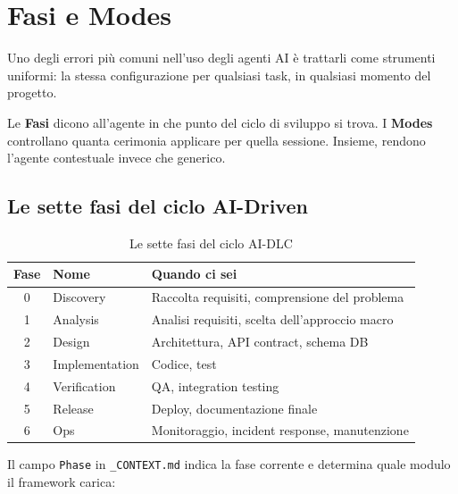 ﻿%

\chapter{Fasi e Modes}
\label{ch:fasi-e-modes}

Uno degli errori più comuni nell'uso degli agenti AI è trattarli come strumenti uniformi: la stessa configurazione per qualsiasi task, in qualsiasi momento del progetto.

Le \textbf{Fasi} dicono all'agente in che punto del ciclo di sviluppo si trova. I \textbf{Modes} controllano quanta cerimonia applicare per quella sessione. Insieme, rendono l'agente contestuale invece che generico.

\section{Le sette fasi del ciclo AI-Driven}
\label{sec:06-sette-fasi}

\begin{table}[htbp]
  \centering
  \begin{tabular}{cll}
    \toprule
    \textbf{Fase} & \textbf{Nome} & \textbf{Quando ci sei} \\
    \midrule
    0 & Discovery & Raccolta requisiti, comprensione del problema \\
    1 & Analysis & Analisi requisiti, scelta dell'approccio macro \\
    2 & Design & Architettura, API contract, schema DB \\
    3 & Implementation & Codice, test \\
    4 & Verification & QA, integration testing \\
    5 & Release & Deploy, documentazione finale \\
    6 & Ops & Monitoraggio, incident response, manutenzione \\
    \bottomrule
  \end{tabular}
  \caption{Le sette fasi del ciclo AI-DLC}
  \label{tab:06-fasi}
\end{table}

Il campo \texttt{Phase} in \texttt{\_CONTEXT.md} indica la fase corrente e determina quale modulo il framework carica:

